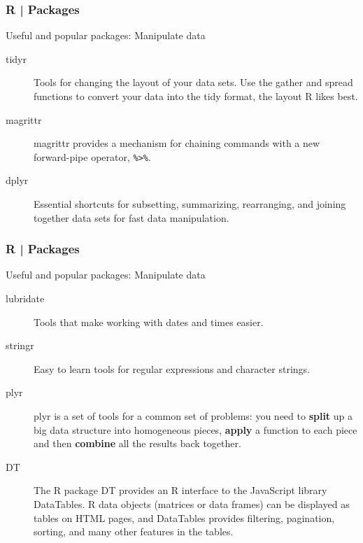 \begin{frame}[fragile]
  \frametitle{R | Packages}
  \begin{block}{Useful and popular packages: Manipulate data}
    \begin{description}
      \item[\alert{tidyr}] Tools for changing the layout of your data sets. Use the gather and spread functions to convert your data into the \alert{tidy format}, the layout R likes best.
      \item[\alert{magrittr}] magrittr provides a mechanism for chaining commands with a new \alert{forward-pipe operator}, \verb|%>%|.
      \item[\alert{dplyr}] Essential shortcuts for subsetting, summarizing, rearranging, and joining together data sets for \alert{fast data manipulation}.
    \end{description}
  \end{block}
\end{frame}

\begin{frame}[fragile]
  \frametitle{R | Packages}
  \begin{block}{Useful and popular packages: Manipulate data}
    \begin{description}
      \item[\alert{lubridate}] Tools that make working with \alert{dates and times} easier.
      \item[\alert{stringr}] Easy to learn tools for \alert{regular expressions and character strings}.
      \item[plyr] plyr is a set of tools for a common set of problems: you need to \textbf{split} up a big data structure into homogeneous pieces, \textbf{apply} a function to each piece and then \textbf{combine} all the results back together.
      \item[DT] The R package DT provides an R interface to the JavaScript library DataTables. R data objects (matrices or data frames) can be displayed as tables on HTML pages, and DataTables provides filtering, pagination, sorting, and many other features in the tables.
    \end{description}
  \end{block}
\end{frame}

